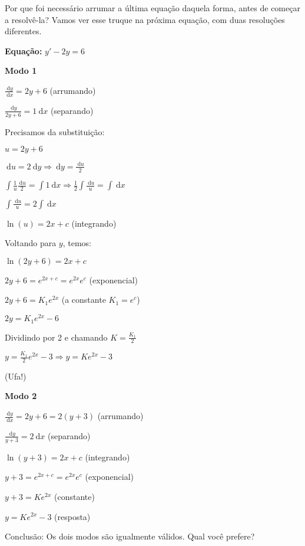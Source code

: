 \documentclass[a4paper]{article}
\newcommand{\ud}{\mathrm{\ d}}
\begin{document}
Por que foi necessário arrumar a última equação daquela forma, antes
de começar a resolvê-la? Vamos ver esse truque na próxima equação, com
duas resoluções diferentes.

{\bf Equação:}
$y' - 2y = 6$

\begin{multicols}{2}
{\bf Modo 1}

\smallskip

$\frac{\ud y}{\ud x} = 2y + 6$ (arrumando)

\smallskip

$\frac{\ud y}{2y+6} = 1\ud x$ (separando)

\smallskip
Precisamos da substituição:

$u = 2y+6$

\smallskip

$\ud u=2\ud y \Rightarrow \ud y = \frac{\ud u}{2}$

\smallskip

$\int \frac{1}{u} \frac{\ud u}{2} = \int 1 \ud x \Rightarrow \frac{1}{2}\int
\frac{\ud u}{u} = \int \ud x$

\smallskip

$\int \frac{\ud u}{u} = 2\int \ud x$

\smallskip

$\ln (u) = 2x+c$ (integrando)

\smallskip

Voltando para $y$, temos:

\smallskip

$\ln(2y+6)= 2x+c$

\smallskip

$2y+6 = e^{2x+c}=e^{2x}e^c$ (exponencial)

\smallskip

$2y+6=K_1e^{2x}$ (a constante $K_1 = e^c$)

\smallskip

$2y=K_1e^{2x} -6$

\smallskip

Dividindo por 2 e chamando $K = \frac{K_1}{2}$

\smallskip

$y=\frac{K_1}{2}e^{2x} -3 \Rightarrow y=Ke^{2x}-3$

\smallskip

(Ufa!)

\columnbreak
{\bf Modo 2}

\smallskip

$\frac{\ud y}{\ud x} = 2y + 6 = 2(y+3)$ (arrumando)

\smallskip

$\frac{\ud y}{y+3} = 2\ud x$ (separando)

\smallskip

$\ln (y+3) = 2x+c$ (integrando)

\smallskip

$y+3 = e^{2x+c} = e^{2x}e^c$ (exponencial)

\smallskip

$y +3 = Ke^{2x}$ (constante)
\smallskip

$y = Ke^{2x} - 3$ (resposta)
\end{multicols}


\bigskip
Conclusão: Os dois modos são igualmente válidos. Qual você prefere?
\end{document}
